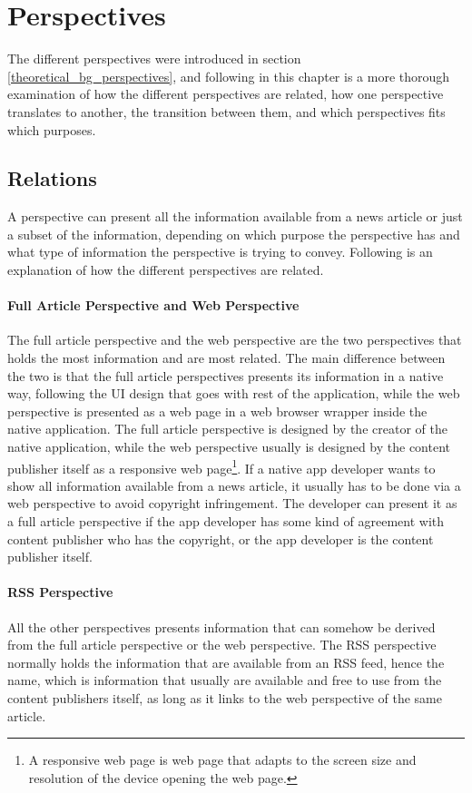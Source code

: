 \chapter{Perspectives}
The different perspectives were introduced in section \ref{theoretical_bg_perspectives}, and following in this chapter is a more thorough examination of how the different perspectives are related, how one perspective translates to another, the transition between them, and which perspectives fits which purposes.

\section{Relations}
A perspective can present all the information available from a news article or just a subset of the information, depending on which purpose the perspective has and what type of information the perspective is trying to convey. Following is an explanation of how the different perspectives are related.

\subsubsection{Full Article Perspective and Web Perspective}
The full article perspective and the web perspective are the two perspectives that holds the most information and are most related. The main difference between the two is that the full article perspectives presents its information in a native way, following the UI design that goes with rest of the application, while the web perspective is presented as a web page in a web browser wrapper inside the native application. The full article perspective is designed by the creator of the native application, while the web perspective usually is designed by the content publisher itself as a responsive web page\footnote{A responsive web page is web page that adapts to the screen size and resolution of the device opening the web page.}. If a native app developer wants to show all information available from a news article, it usually has to be done via a web perspective to avoid copyright infringement. The developer can present it as a full article perspective if the app developer has some kind of agreement with content publisher who has the copyright, or the app developer is the content publisher itself.

\subsubsection{RSS Perspective}
All the other perspectives presents information that can somehow be derived from the full article perspective or the web perspective. The RSS perspective normally holds the information that are available from an RSS feed, hence the name, which is information that usually are available and free to use from the content publishers itself, as long as it links to the web perspective of the same article.

